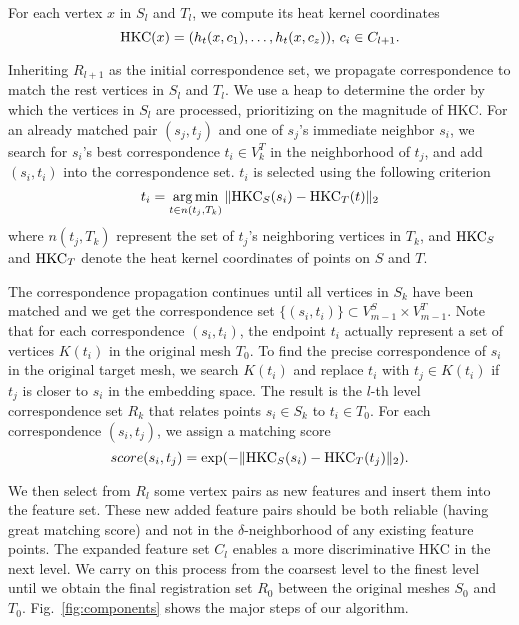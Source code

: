 For each vertex $x$ in $S_l$ and $T_l$, we compute its heat kernel coordinates
\begin{equation}
\operatorname*{HKC}(x)=(h_t(x,c_1),\dots,h_t(x,c_z)) \mbox{, } c_i\in C_{l+1}.
\end{equation}

Inheriting $R_{l+1}$ as the initial correspondence set, we propagate correspondence to match the rest vertices in $S_l$ and $T_l$. We use a heap to determine the order by which the vertices in $S_l$ are processed, prioritizing on the magnitude of HKC. For an already matched pair $(s_j, t_j)$ and one of $s_j$'s immediate neighbor $s_i$, we search for $s_i$'s best correspondence $t_i \in V^T_k$ in the neighborhood of $t_j$, and add $(s_i,t_i)$ into the correspondence set. $t_i$ is selected using the following criterion
\begin{equation}
t_i=\operatorname*{arg\,min}_{t\in n(t_j,T_k)}\|{\operatorname*{HKC}}_S(s_i)-{\operatorname*{HKC}}_T(t)\|_2
\end{equation}
where $n(t_j,T_k)$ represent the set of $t_j$'s neighboring vertices in $T_k$, and $\operatorname*{HKC}_S$ and $\operatorname*{HKC}_T$ denote the heat kernel coordinates of points on $S$ and $T$.

The correspondence propagation continues until all vertices in $S_k$ have been matched and we get the correspondence set $\{(s_i,t_i)\} \subset V^S_{m-1} \times V^T_{m-1}$. Note that for each correspondence $(s_i,t_i)$, the endpoint $t_i$ actually represent a set of vertices $K(t_i)$ in the original mesh $T_0$. To find the precise correspondence of $s_i$ in the original target mesh, we search $K(t_i)$ and replace $t_i$ with $t_j \in K(t_i)$ if $t_j$ is closer to $s_i$ in the embedding space. The result is the $l$-th level correspondence set $R_k$ that relates points $s_i \in S_k$ to $t_i \in T_0$. For each correspondence $(s_i,t_j)$, we assign a matching score
\begin{equation}
score(s_i,t_j)=\exp(-\|{\operatorname*{HKC}}_S(s_i)-{\operatorname*{HKC}}_T(t_j)\|_2).
\end{equation}

We then select from $R_l$ some vertex pairs as new features and insert them into the feature set. These new added feature pairs should be both reliable (having great matching score) and not in the $\delta$-neighborhood of any existing feature points. The expanded feature set $C_l$ enables a more discriminative HKC in the next level. We carry on this process from the coarsest level to the finest level until we obtain the final registration set $R_0$ between the original meshes $S_0$ and $T_0$.
Fig.~\ref{fig:components} shows the major steps of our algorithm.

